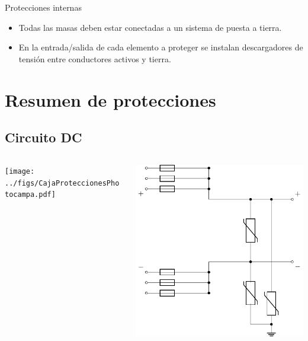 \documentclass[aspectratio=169, usenames,svgnames,dvipsnames]{beamer}
\begin{document}
\begin{frame}[label={sec:orga8b1c5f}]{Protecciones internas}
\begin{itemize}
\item \alert{Todas las masas deben estar conectadas a un sistema de puesta a
tierra}.

\item En la entrada/salida de cada elemento a proteger se instalan
\alert{descargadores de tensión} entre conductores activos y
tierra.
\end{itemize}
\end{frame}

\section{Resumen de protecciones}
\label{sec:orgfb1f88f}

\subsection{Circuito DC}
\label{sec:org359690d}
\begin{frame}[label={sec:org2ca8b52}]{}
\begin{columns}
\begin{column}{0.4\columnwidth}
\begin{center}
\texttt{[image: ../figs/CajaProteccionesPhotocampa.pdf]}
\end{center}
\end{column}

\begin{column}{0.6\columnwidth}
\begin{center}
\includegraphics[height=0.8\textheight]{../figs/proteccionesDC.pdf}
\end{center}
\end{column}
\end{columns}
\end{frame}
\end{document}
